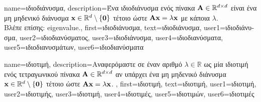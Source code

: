 {name={\foreignlanguage{greek}{ιδιοδιάνυσμα}}, 
	description={\foreignlanguage{greek}{Ένα ιδιοδιάνυσμα ενός πίνακα} 
		$\mathbf{A} \in \mathbb{R}^{d \times d}$ 
		\foreignlanguage{greek}{είναι ένα μη μηδενικό διάνυσμα ${\bf x} \in \mathbb{R}^{d} \setminus \{ \mathbf{0} \}$ 
		τέτοιο ώστε $\mathbf{A} {\bf x} = \lambda {\bf x}$ με κάποια}  $\lambda$.\\
		\foreignlanguage{greek}{Βλέπε επίσης:} \gls{eigenvalue}.},
	first={\foreignlanguage{greek}{ιδιοδιάνυσμα}},
	text={\foreignlanguage{greek}{ιδιοδιάνυσμα}},
	user1={\foreignlanguage{greek}{ιδιοδιάνυσμα}}, %
	user2={\foreignlanguage{greek}{ιδιοδιανύσματος}}, %
	user3={\foreignlanguage{greek}{ιδιοδιάνυσμα}}, %
	user4={\foreignlanguage{greek}{ιδιοδιανύσματα}}, %
	user5={\foreignlanguage{greek}{ιδιοδιανυσμάτων}}, %
	user6={\foreignlanguage{greek}{ιδιοδιανύσματα}} %
}

{name={\foreignlanguage{greek}{ιδιοτιμή}}, 
	description={\foreignlanguage{greek}{Αναφερόμαστε σε έναν αριθμό} 
		$\lambda \in \mathbb{R}$ \foreignlanguage{greek}{ως μία ιδιοτιμή ενός τετραγωνικού πίνακα 
		$\mathbf{A} \in \mathbb{R}^{d \times d}$ 
		αν υπάρχει ένα μη μηδενικό διάνυσμα 
		${\bf x} \in \mathbb{R}^{d} \setminus \{ \mathbf{0} \}$ τέτοιο ώστε} $\mathbf{A} {\bf x} = \lambda {\bf x}$. },
	first={\foreignlanguage{greek}{ιδιοτιμή}},
	text={\foreignlanguage{greek}{ιδιοτιμή}},
	user1={\foreignlanguage{greek}{ιδιοτιμή}}, %
	user2={\foreignlanguage{greek}{ιδιοτιμής}}, %
	user3={\foreignlanguage{greek}{ιδιοτιμή}}, %
	user4={\foreignlanguage{greek}{ιδιοτιμές}}, %
	user5={\foreignlanguage{greek}{ιδιοτιμών}}, %
	user6={\foreignlanguage{greek}{ιδιοτιμές}} %
}

